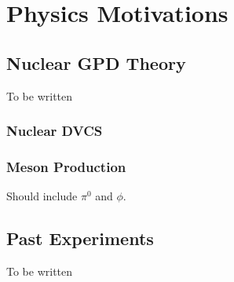 
\chapter{Physics Motivations}
\label{chap:physics}

\section{Nuclear GPD Theory}
To be written

\subsection{Nuclear DVCS}

\subsection{Meson Production}

Should include $\pi^0$ and $\phi$.

\section{Past Experiments}
To be written


